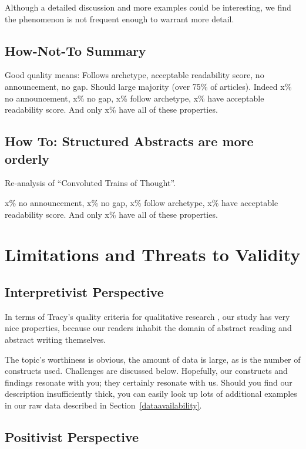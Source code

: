 \documentclass[10pt,journal,compsoc]{IEEEtran}
\begin{document}
Although a detailed discussion and more examples could be interesting, 
we find the phenomenon is not frequent enough to warrant more detail.


\subsection{How-Not-To Summary}

Good quality means: Follows archetype, acceptable readability score, no announcement, no gap.
Should large majority (over 75\% of articles).
Indeed x\% no announcement, x\% no gap, x\% follow archetype, x\% have acceptable readability score.
And only x\% have all of these properties.


\subsection{How To: Structured Abstracts are more orderly}

Re-analysis of ``Convoluted Trains of Thought''. 

x\% no announcement, x\% no gap, x\% follow archetype, x\% have acceptable readability score.
And only x\% have all of these properties.




\section{Limitations and Threats to Validity}

\subsection{Interpretivist Perspective}

In terms of Tracy's quality criteria for qualitative research \cite{Tracy10},
our study has very nice properties, because our readers inhabit
the domain of abstract reading and abstract writing themselves.

The topic's worthiness is obvious, the amount of data is large,
as is the number of constructs used.
Challenges are discussed below.
Hopefully, our constructs and findings resonate with you;
they certainly resonate with us.
Should you find our description insufficiently thick,
you can easily look up lots of additional examples in our raw data
described in Section~\ref{dataavailability}.


\subsection{Positivist Perspective}
\end{document}
